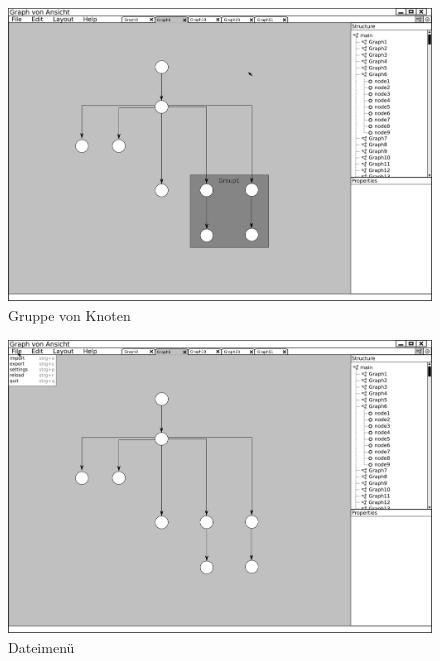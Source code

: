\begin{figure}[!hb]
  \centering
  \includegraphics[width=380pt]{resourcen/gui_view_group.png}
  \caption{Gruppe von Knoten}
  \label{fig:gui_view_group}
\end{figure}

\begin{figure}[hb]
  \centering
  \includegraphics[width=380pt]{resourcen/gui_view_filemenu.png}
  \caption{Dateimenü}
  \label{fig:gui_view_filemenu}
\end{figure}

